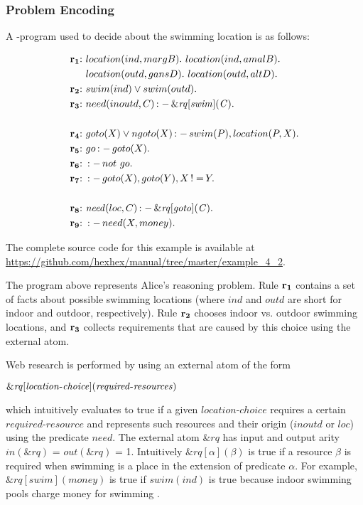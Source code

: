 \documentclass[a4paper, titlepage]{article}
\newcommand{\ext}[3]{\ensuremath{\&{#1}[#2](#3)}}
\DeclareMathOperator{\leftimpl}{:-}
\DeclareMathOperator{\noteq}{!=}
\newcommand{\examplelink}[1]{\url{https://github.com/hexhex/manual/tree/master/#1}}
\newcommand\mycenterline[1]{\par\smallskip\centerline{#1} \smallskip}
\newcommand{\row}[1]{%
  \ensuremath{\color{black}\ensuremath{\mathbf{#1}} \color{black}}%
}
\newcommand{\rowprefix}[1]{%
  \ensuremath{\color{black}\mathbf{#1{:}}\ }%
}
\begin{document}
\subsubsection{Problem Encoding}
A \hex-program used to decide about the swimming location is as 
follows:
\begin{exmp}
\label{swimExample}
\begin{align*}
\rowprefix{r_1}& location(ind, margB). \ location(ind, amalB). \ \\& 
location(outd, gansD). \ location(outd, altD). \\  
\rowprefix{r_2}& swim(ind) \vee swim(outd).\\ 
\rowprefix{r_3}& need(inoutd, C) \leftimpl \ext{\mathit{rq}}
{\mathit{swim}}{\mathit{C}}. \\
\\
\rowprefix{r_4}& goto(X) \vee ngoto(X) \leftimpl swim(P), 
location(P, X).\\
\rowprefix{r_5}& go \leftimpl goto(X).\\
\rowprefix{r_6}& \leftimpl not \ go. \\
\rowprefix{r_7}& \leftimpl goto(X), goto(Y), X \noteq Y. \\
\\
\rowprefix{r_8}& \mathit{need}(loc, C) \leftimpl 
\ext{\mathit{rq}}{\mathit{goto}}{\mathit{C}}. \\ 
\rowprefix{r_9}& \leftimpl need(X, money).
\end{align*}
\end{exmp}
The complete source code for this example is available at \examplelink{example_4_2}.

The \hex{} program above represents Alice's reasoning 
problem. Rule $\row{r_1}$ contains a set of facts about possible 
swimming locations (where $\mathit{ind}$ and 
$\mathit{outd}$ are short for indoor and outdoor, 
respectively). Rule $\row{r_2}$ chooses indoor vs. outdoor 
swimming locations, and $\row{r_3}$ collects requirements that 
are caused by this choice using the external atom. 

Web research is performed by using an external atom of the 
form 
\\ \mycenterline{$\ext{\mathit{rq}}{\mathit{location}$-$
\mathit{choice}}{\mathit{required}$-$\mathit{resources}}$}
which intuitively 
evaluates to true if a given $\mathit{location}$-$\mathit{choice}$ 
requires a certain $\mathit{required}$-$\mathit{resource}$ and 
represents such resources  and their origin 
($\mathit{inoutd}$ or $\mathit{loc}$) using the predicate 
$\mathit{need}$. The external atom $\mathit{\&rq}$ has 
input and output arity $\mathit{in(\&rq)}$ = 
$\mathit{out(\&rq)}$ = 1. Intuitively  $\ext{\mathit{rq}}
{\mathit{\alpha}}{\mathit{\beta}}$ is true if a resource 
$\beta$ is required when swimming is a place in the 
extension of predicate $\alpha$. For example, 
$\ext{\mathit{rq}}{\mathit{swim}}{\mathit{money}}$ is true 
if $\mathit{swim(ind)}$ is true because indoor swimming 
pools charge money for swimming \cite{efikrs2015}. 
\end{document}
